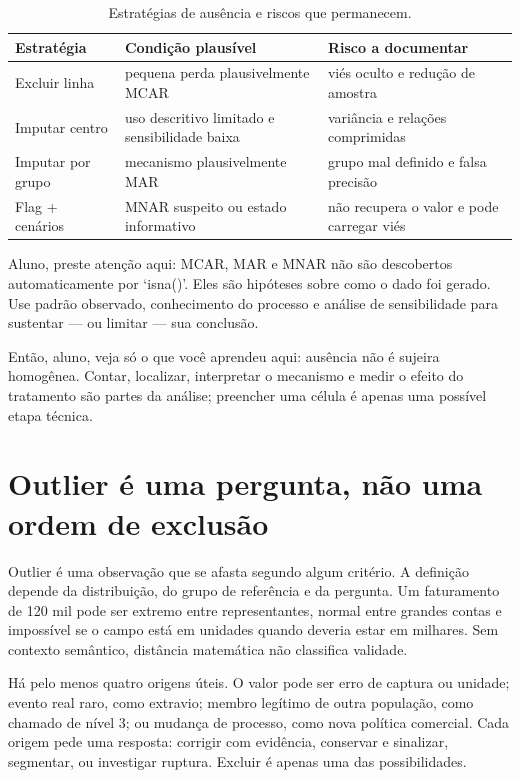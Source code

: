 \begin{table}[htbp]
\centering
\small
\caption{Estratégias de ausência e riscos que permanecem.}
\label{tab:ausencia-estrategias}
\begin{tabularx}{0.95\textwidth}{@{}p{2.8cm}YY@{}}
\toprule
\textbf{Estratégia} & \textbf{Condição plausível} & \textbf{Risco a documentar} \\
\midrule
Excluir linha & pequena perda plausivelmente MCAR & viés oculto e redução de amostra \\
Imputar centro & uso descritivo limitado e sensibilidade baixa & variância e relações comprimidas \\
Imputar por grupo & mecanismo plausivelmente MAR & grupo mal definido e falsa precisão \\
Flag + cenários & MNAR suspeito ou estado informativo & não recupera o valor e pode carregar viés \\
\bottomrule
\end{tabularx}
\end{table}

\begin{GuidedBox}
Aluno, preste atenção aqui: MCAR, MAR e MNAR não são descobertos automaticamente por `isna()'. Eles são hipóteses sobre como o dado foi gerado. Use padrão observado, conhecimento do processo e análise de sensibilidade para sustentar --- ou limitar --- sua conclusão.
\end{GuidedBox}

\begin{SummaryBox}
Então, aluno, veja só o que você aprendeu aqui: ausência não é sujeira homogênea. Contar, localizar, interpretar o mecanismo e medir o efeito do tratamento são partes da análise; preencher uma célula é apenas uma possível etapa técnica.
\end{SummaryBox}

\section{Outlier é uma pergunta, não uma ordem de exclusão}

Outlier é uma observação que se afasta segundo algum critério. A definição depende da distribuição, do grupo de referência e da pergunta. Um faturamento de 120 mil pode ser extremo entre representantes, normal entre grandes contas e impossível se o campo está em unidades quando deveria estar em milhares. Sem contexto semântico, distância matemática não classifica validade.

Há pelo menos quatro origens úteis. O valor pode ser erro de captura ou unidade; evento real raro, como extravio; membro legítimo de outra população, como chamado de nível 3; ou mudança de processo, como nova política comercial. Cada origem pede uma resposta: corrigir com evidência, conservar e sinalizar, segmentar, ou investigar ruptura. Excluir é apenas uma das possibilidades.

